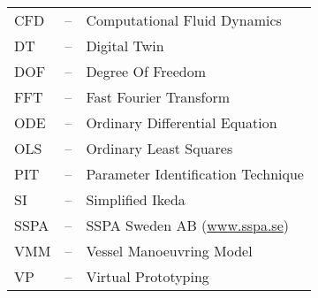 
\begin{tabular}{ l c l }
CFD & -- & Computational Fluid Dynamics\\
DT  & -- & Digital Twin\\
DOF & -- & Degree Of Freedom\\
FFT & -- & Fast Fourier Transform\\
ODE & -- & Ordinary Differential Equation\\
OLS & -- & Ordinary Least Squares\\
PIT & -- & Parameter Identification Technique\\
SI  & -- & Simplified Ikeda\\
SSPA & -- & SSPA Sweden AB (\url{www.sspa.se})\\
VMM & -- & Vessel Manoeuvring Model\\
VP & -- & Virtual Prototyping 
\end{tabular}
